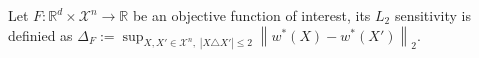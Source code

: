 Let $F:\mathbb{R}^d \times \mathcal{X}^n \to \mathbb{R}$ be an objective function of interest, its $L_2$ sensitivity is definied as $\Delta_F := \sup_{X,X' \in \mathcal{X}^n,\; |X \triangle X'|\le 2} \left\| w^*(X) - w^*(X') \right\|_2$.